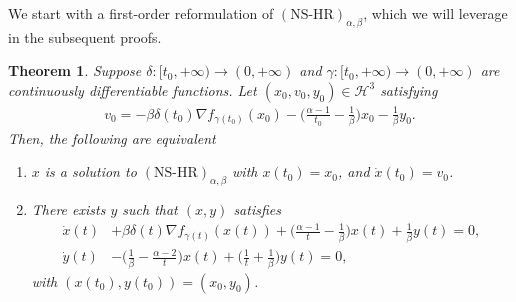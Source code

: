 \documentclass[11pt]{article}
\numberwithin{equation}{section}
\newtheorem{theorem}{Theorem}[section]
\begin{document}
We start with a first-order reformulation of $(\text{NS-HR})_{\alpha,\beta}$, which we will leverage in the subsequent proofs. 
\begin{theorem}
\label{thm:first-order}
    {Suppose $\delta:[t_0,+\infty
    ) \to (0,+\infty)$ and $\gamma:[t_0,+\infty
    ) \to (0,+\infty)$ are continuously differentiable functions}. Let $(x_0,v_0,y_0) \in \mathcal{H}^3$ satisfying 
    \begin{align}
    \label{compatibility condition}
        v_0=-\beta\delta(t_0)\nabla f_{\gamma(t_0)}(x_0)-\Big(\frac{\alpha-1}{t_0}-\frac{1}{\beta}\Big)x_0-\frac{1}{\beta}y_0.
    \end{align}
    Then, the following are equivalent 
    \begin{enumerate}[label=(\roman*)]
        \item $x$ is a solution to $(\text{NS-HR})_{\alpha,\beta}$ with $x(t_0)=x_0$, and $\dot{x}(t_0)=v_0$. 
        \item There exists $y$ such that $(x,y)$ satisfies 
\begin{align}
 \dot{x}(t)&+\beta\delta(t)\nabla f_{\gamma(t)}(x(t))+\Big(\frac{\alpha-1}{t}-\frac{1}{\beta}\Big)x(t)+\frac{1}{\beta}y(t)=0, \label{eq:x}\\
\dot{y}(t)
&- \Big(\frac{1}{\beta}-\frac{\alpha-2}{t}\Big)x(t)
+ \Big(\frac{1}{t}+\frac{1}{\beta}\Big)y(t)
= 0, \label{eq:y}
\end{align}
        with $(x(t_0),y(t_0))=(x_0,y_0)$. 
    \end{enumerate}
\end{theorem}

\end{document}
